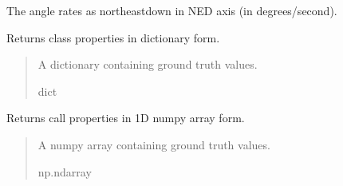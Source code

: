 \documentclass[letterpaper,10pt,english]{sphinxmanual}
\begin{document}
\begin{fulllineitems}
\begin{fulllineitems}
\label{\detokenize{modules/waypoints/trajectory:qnav.waypoints.trajectory.GroundTruth.angle_rates}}
\pysigstartsignatures
{}
\pysigstopsignatures
\sphinxAtStartPar
The angle rates as north\sphinxhyphen{}east\sphinxhyphen{}down in NED axis (in degrees/second).

\end{fulllineitems}


\begin{fulllineitems}
\label{\detokenize{modules/waypoints/trajectory:qnav.waypoints.trajectory.GroundTruth.as_dict}}
\pysigstartsignatures
{}
\pysigstopsignatures
\sphinxAtStartPar
Returns class properties in dictionary form.
\begin{quote}\begin{description}
\sphinxAtStartPar
A dictionary containing ground truth values.

\sphinxAtStartPar
dict

\end{description}\end{quote}

\end{fulllineitems}


\begin{fulllineitems}
\label{\detokenize{modules/waypoints/trajectory:qnav.waypoints.trajectory.GroundTruth.as_numpy}}
\pysigstartsignatures
{}
\pysigstopsignatures
\sphinxAtStartPar
Returns call properties in 1D numpy array form.
\begin{quote}\begin{description}
\sphinxAtStartPar
A numpy array containing ground truth values.

\sphinxAtStartPar
np.ndarray

\end{description}\end{quote}

\end{fulllineitems}


\end{fulllineitems}
\end{document}
